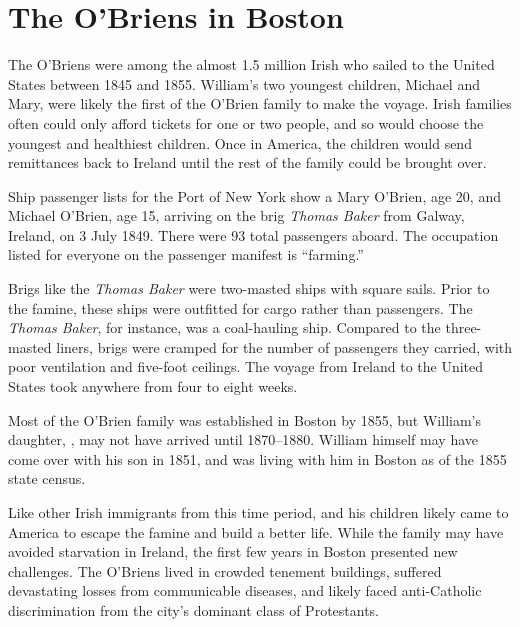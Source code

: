 \chapter{The O'Briens in Boston}

The O'Briens were among the almost 1.5 million Irish who sailed to the United States between 1845 and 1855.\cite{Miller:291} William's two youngest children, Michael and Mary, were likely the first of the O'Brien family to make the voyage. Irish families often could only afford tickets for one or two people, and so would choose the youngest and healthiest children.\cite{Miller:292} Once in America, the children would send remittances back to Ireland until the rest of the family could be brought over.\cite{Miller:295}

Ship passenger lists for the Port of New York show a Mary O'Brien, age 20, and Michael O'Brien, age 15, arriving on the brig \textit{Thomas Baker} from Galway, Ireland, on 3 July 1849. There were 93 total passengers aboard. The occupation listed for everyone on the passenger manifest is ``farming.''\cite{ThomasBaker}

Brigs like the \textit{Thomas Baker} were two-masted ships with square sails.\cite{OHanlon:35} Prior to the famine, these ships were outfitted for cargo rather than passengers.\cite{Laxton:9} The \textit{Thomas Baker}, for instance, was a coal-hauling ship.\cite{MorningAdvertiser} Compared to the three-masted liners, brigs were cramped for the number of passengers they carried, with poor ventilation and five-foot ceilings.\cite{OHanlon:33} The voyage from Ireland to the United States took anywhere from four to eight weeks.

Most of the O'Brien family was established in Boston by 1855,\cite{Census1855Abigail,John2OBrienCivilMarriage} but William's daughter, , may not have arrived until 1870--1880.\cite{Census1880Edward} William himself may have come over with his son  in 1851,\cite{Edward2OBrienNaturalization} and was living with him in Boston as of the 1855 state census.\cite{Census1855William}

Like other Irish immigrants from this time period,  and his children likely came to America to escape the famine and build a better life. While the family may have avoided starvation in Ireland, the first few years in Boston presented new challenges. The O'Briens lived in crowded tenement buildings, suffered devastating losses from communicable diseases, and likely faced anti-Catholic discrimination from the city's dominant class of Protestants.
	
